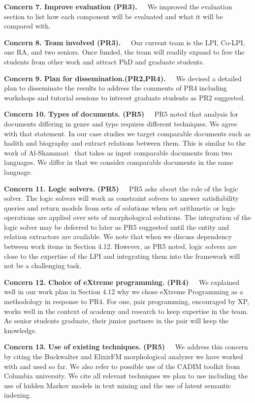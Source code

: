 \documentclass[12pt]{article}
\begin{document}
{\bf Concern 7. Improve evaluation (PR3).~~}
We improved the evaluation section to list how each component will 
be evaluated and what it will be compared with. 

{\bf Concern 8. Team involved (PR3).~~}
Our current team is the LPI, Co-LPI, one RA, 
and two seniors. %
Once funded, the team will readily expand to 
free the students from other work and 
attract PhD and graduate students.


{\bf Concern 9. Plan for dissemination.(PR2,PR4).~~}
We devised a detailed plan to disseminate the results
to address the comments of PR4 including 
workshops and tutorial sessions to 
interest graduate students as PR2 suggested. 

{\bf Concern 10. Types of documents. (PR5)~~}
PR5 noted that analysis for documents differing in genre and 
type requires different techniques. 
We agree with that statement. 
In our case studies we target comparable documents such as 
hadith and biography and extract relations between them. 
This is similar to the work of Al-Shammari~\cite{AlSham08} that
takes as input comparable documents from two languages. 
We differ in that we consider comparable documents in the same
language.

{\bf Concern 11. Logic solvers. (PR5)~~}
PR5 asks about the role of the logic solver. 
The logic solvers will work as constraint solvers to answer 
satisfiability queries and return models from sets of solutions
when set arithmetic or logic operations are applied over
sets of morphological solutions. 
The integration of the logic solver may be deferred to later 
as PR5 suggested until the entity and relation extractors are 
available. We note that when we discuss dependency between 
work items in Section 4.12. 
However, as PR5 noted, logic solvers are close to the expertise of
the LPI and integrating them into the framework will not be
a challenging task.


{\bf Concern 12. Choice of eXtreme programming. (PR4)~~}
We explained well in our work plan in Section 4.12 why we chose 
eXtreme Programming as a methodology in response to PR4. 
For one, pair programming, encouraged by XP, 
works well in the context of academy and research to keep
expertise in the team. 
As senior students graduate, their junior partners in the pair
will keep the knowledge. 

{\bf Concern 13. Use of existing techniques. (PR5)~~}
We address this concern by citing the Buckwalter and ElixirFM 
morphological analyzer we have worked with and used so far. 
We also refer to possible use of the CADIM toolkit from Columbia
university. 
We cite all relevant techniques we plan to use including the use 
of hidden Markov models in text mining and the use of latent semantic
indexing. 
\end{document}
